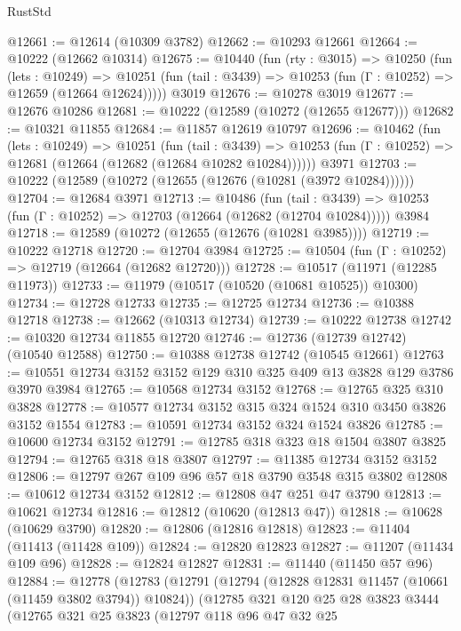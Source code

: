 \begin{lexlean}{RustStd}
\begin{coremodule}
@12661 := @12614 (@10309 @3782)
@12662 := @10293 @12661
@12664 := @10222 (@12662 @10314)
@12675 := @10440
    (fun (rty : @3015) =>
    @10250
      (fun (lets : @10249) =>
      @10251 (fun (tail : @3439) => @10253 (fun (Γ : @10252) => @12659 (@12664 @12624)))))
    @3019
@12676 := @10278 @3019
@12677 := @12676 @10286
@12681 := @10222 (@12589 (@10272 (@12655 @12677)))
@12682 := @10321 @11855
@12684 := @11857 @12619 @10797
@12696 := @10462
    (fun (lets : @10249) =>
    @10251
      (fun (tail : @3439) =>
      @10253 (fun (Γ : @10252) => @12681 (@12664 (@12682 (@12684 @10282 @10284))))))
    @3971
@12703 := @10222 (@12589 (@10272 (@12655 (@12676 (@10281 (@3972 @10284))))))
@12704 := @12684 @3971
@12713 := @10486
    (fun (tail : @3439) => @10253 (fun (Γ : @10252) => @12703 (@12664 (@12682 (@12704 @10284)))))
    @3984
@12718 := @12589 (@10272 (@12655 (@12676 (@10281 @3985))))
@12719 := @10222 @12718
@12720 := @12704 @3984
@12725 := @10504 (fun (Γ : @10252) => @12719 (@12664 (@12682 @12720)))
@12728 := @10517 (@11971 (@12285 @11973))
@12733 := @11979 (@10517 (@10520 (@10681 @10525)) @10300)
@12734 := @12728 @12733
@12735 := @12725 @12734
@12736 := @10388 @12718
@12738 := @12662 (@10313 @12734)
@12739 := @10222 @12738
@12742 := @10320 @12734 @11855 @12720
@12746 := @12736 (@12739 @12742) (@10540 @12588)
@12750 := @10388 @12738 @12742 (@10545 @12661)
@12763 := @10551 @12734 @3152 @3152 @129 @310 @325 @409 @13 @3828 @129 @3786 @3970 @3984
@12765 := @10568 @12734 @3152
@12768 := @12765 @325 @310 @3828
@12778 := @10577 @12734 @3152 @315 @324 @1524 @310 @3450 @3826 @3152 @1554
@12783 := @10591 @12734 @3152 @324 @1524 @3826
@12785 := @10600 @12734 @3152
@12791 := @12785 @318 @323 @18 @1504 @3807 @3825
@12794 := @12765 @318 @18 @3807
@12797 := @11385 @12734 @3152 @3152
@12806 := @12797 @267 @109 @96 @57 @18 @3790 @3548 @315 @3802
@12808 := @10612 @12734 @3152
@12812 := @12808 @47 @251 @47 @3790
@12813 := @10621 @12734
@12816 := @12812 (@10620 (@12813 @47))
@12818 := @10628 (@10629 @3790)
@12820 := @12806 (@12816 @12818)
@12823 := @11404 (@11413 (@11428 @109))
@12824 := @12820 @12823
@12827 := @11207 (@11434 @109 @96)
@12828 := @12824 @12827
@12831 := @11440 (@11450 @57 @96)
@12884 := @12778
    (@12783
      (@12791
        (@12794 (@12828 @12831 @11457 (@10661 (@11459 @3802 @3794)) @10824))
        (@12785
          @321
          @120
          @25
          @28
          @3823
          @3444
          (@12765
            @321
            @25
            @3823
            (@12797
              @118
              @96
              @47
              @32
              @25

\end{coremodule}
\end{lexlean}
